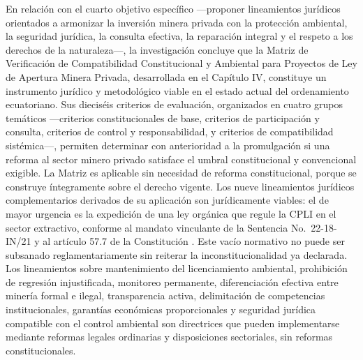 En relación con el cuarto objetivo específico —proponer lineamientos jurídicos orientados a armonizar la inversión minera privada con la protección ambiental, la seguridad jurídica, la consulta efectiva, la reparación integral y el respeto a los derechos de la naturaleza—, la investigación concluye que la Matriz de Verificación de Compatibilidad Constitucional y Ambiental para Proyectos de Ley de Apertura Minera Privada, desarrollada en el Capítulo IV, constituye un instrumento jurídico y metodológico viable en el estado actual del ordenamiento ecuatoriano. Sus dieciséis criterios de evaluación, organizados en cuatro grupos temáticos —criterios constitucionales de base, criterios de participación y consulta, criterios de control y responsabilidad, y criterios de compatibilidad sistémica—, permiten determinar con anterioridad a la promulgación si una reforma al sector minero privado satisface el umbral constitucional y convencional exigible. La Matriz es aplicable sin necesidad de reforma constitucional, porque se construye íntegramente sobre el derecho vigente. Los nueve lineamientos jurídicos complementarios derivados de su aplicación son jurídicamente viables: el de mayor urgencia es la expedición de una ley orgánica que regule la CPLI en el sector extractivo, conforme al mandato vinculante de la Sentencia No.\ 22-18-IN/21 y al artículo 57.7 de la Constitución \parencite{cce_22_18_in_21,cre_2008}. Este vacío normativo no puede ser subsanado reglamentariamente sin reiterar la inconstitucionalidad ya declarada. Los lineamientos sobre mantenimiento del licenciamiento ambiental, prohibición de regresión injustificada, monitoreo permanente, diferenciación efectiva entre minería formal e ilegal, transparencia activa, delimitación de competencias institucionales, garantías económicas proporcionales y seguridad jurídica compatible con el control ambiental son directrices que pueden implementarse mediante reformas legales ordinarias y disposiciones sectoriales, sin reformas constitucionales.


